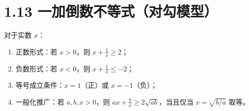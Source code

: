 \documentclass{article}
\begin{document}
\section*{1.13 一加倒数不等式（对勾模型）}
对于实数 \( x \)：
\begin{enumerate}
    \item 正数形式：若 \( x>0 \)，则 \( x+\frac{1}{x} \geq 2 \)；
    \item 负数形式：若 \( x<0 \)，则 \( x+\frac{1}{x} \leq -2 \)；
    \item 等号成立条件：\( x=1 \)（正）或 \( x=-1 \)（负）；
    \item 一般化推广：若 \( a,b,x>0 \)，则 \( ax+\frac{b}{x} \geq 2\sqrt{ab} \)，当且仅当 \( x=\sqrt{b/a} \) 取等。
\end{enumerate}
\end{document}
